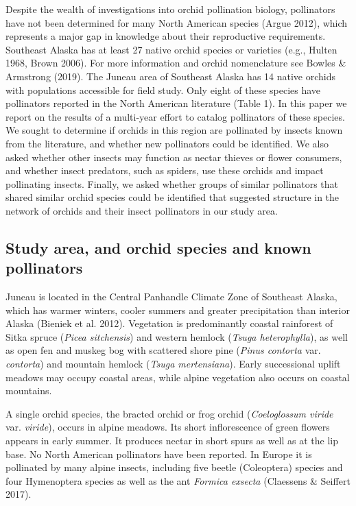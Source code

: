 \begin{multicols}{2}
Despite the wealth of investigations into orchid pollination biology,
pollinators have not been determined for many North American species
(Argue 2012), which represents a major gap in knowledge about their
reproductive requirements. Southeast Alaska has at least 27 native
orchid species or varieties (e.g., Hulten 1968, Brown 2006). For more
information and orchid nomenclature see Bowles \& Armstrong (2019). The
Juneau area of Southeast Alaska has 14 native orchids with populations
accessible for field study. Only eight of these species have pollinators
reported in the North American literature (Table 1). In this paper we
report on the results of a multi-year effort to catalog pollinators of
these species. We sought to determine if orchids in this region are
pollinated by insects known from the literature, and whether new
pollinators could be identified. We also asked whether other insects may
function as nectar thieves or flower consumers, and whether insect
predators, such as spiders, use these orchids and impact pollinating
insects. Finally, we asked whether groups of similar pollinators that
shared similar orchid species could be identified that suggested
structure in the network of orchids and their insect pollinators in our
study area.

\subsection{Study area, and orchid species and known pollinators}

Juneau is located in the Central Panhandle Climate Zone of Southeast
Alaska, which has warmer winters, cooler summers and greater
precipitation than interior Alaska (Bieniek et al. 2012). Vegetation is
predominantly coastal rainforest of Sitka spruce (\emph{Picea
sitchensis}) and western hemlock (\emph{Tsuga heterophylla}), as well as
open fen and muskeg bog with scattered shore pine (\emph{Pinus contorta}
var. \emph{contorta}) and mountain hemlock (\emph{Tsuga mertensiana}).
Early successional uplift meadows may occupy coastal areas, while alpine
vegetation also occurs on coastal mountains.

A single orchid species, the bracted orchid or frog orchid
(\emph{Coeloglossum viride} var. \emph{viride}), occurs in alpine
meadows. Its short inflorescence of green flowers appears in early
summer. It produces nectar in short spurs as well as at the lip base. No
North American pollinators have been reported. In Europe it is
pollinated by many alpine insects, including five beetle (Coleoptera)
species and four Hymenoptera species as well as the ant \emph{Formica
exsecta} (Claessens \& Seiffert 2017).


\end{multicols}
